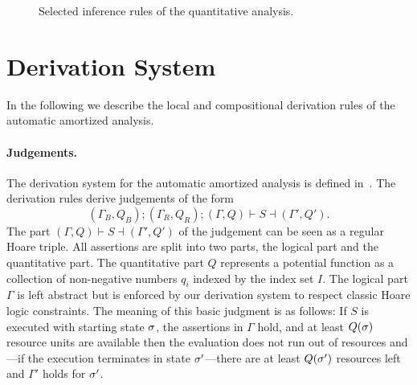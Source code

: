 \documentclass[nocopyrightspace,preprint,pldi]{sigplanconf-pldi15}
\newcommand{\ifshort}[2]{\ifx\fullversion\undefined{#1}\else{#2}\fi}
\newcommand{\sectskip}[0]{\ifshort{\vspace{-3pt}}{}}
\newcommand{\paraskip}[0]{\ifshort{\vspace{-2pt}}{}}
\newcommand{\pref}[1]{\prettyref{#1}}
\begin{document}
{\begin{figure}
\caption{Selected inference rules of the quantitative analysis.}
\label{fig:auto}
\end{figure}
}{}

\sectskip
\section{Derivation System}

In the following we describe the local and compositional derivation
rules of the automatic amortized analysis.

\paraskip
\paragraph{Judgements.}

The derivation system for the automatic amortized analysis is defined
in~\pref{fig:auto}.  The derivation rules derive judgements of the form
$$
  (\Gamma_B, Q_B); (\Gamma_R, Q_R);
    (\Gamma, Q) \vdash S \dashv (\Gamma', Q').
$$
%
The part $(\Gamma, Q) \vdash S \dashv (\Gamma', Q')$ of the judgement
can be seen as a regular Hoare triple.  All assertions are split into
two parts, the logical part and the quantitative part.  The
quantitative part $Q$ represents a potential function as a collection
of non-negative numbers $q_i$ indexed by the index set $I$.  The
logical part $\Gamma$ is left abstract but is enforced by our
derivation system to respect classic Hoare logic constraints.
%
The meaning of this basic judgment is as follows: If $S$ is executed
with starting state $\sigma$, the assertions in $\Gamma$
hold, and at least $Q(\sigma)$ resource units are available then the
evaluation does not run out of resources and---if the execution
terminates in state $\sigma'$---there are at least $Q(\sigma')$
resources left and $\Gamma'$ holds for $\sigma'$.
\end{document}
